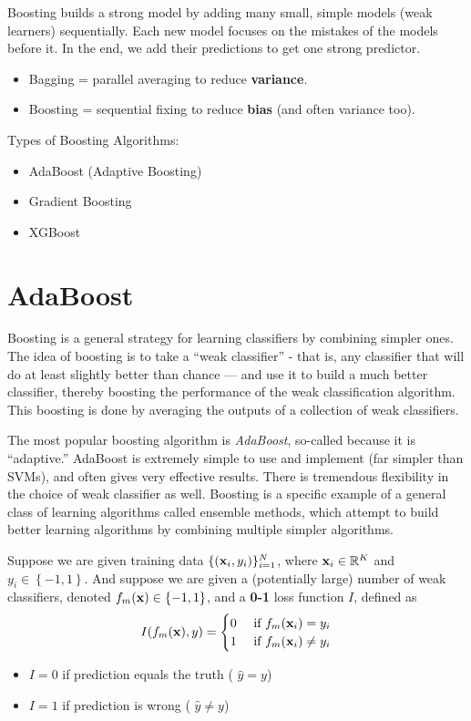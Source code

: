 Boosting builds a strong model by adding many small, simple models (weak learners) sequentially. Each new model focuses on the mistakes of the models before it. In the end, we add their predictions to get one strong predictor.

\begin{itemize}
	\item Bagging = parallel averaging to reduce \textbf{variance}.
	\item Boosting = sequential fixing to reduce \textbf{bias} (and often variance too).
\end{itemize}

Types of Boosting Algorithms:
\begin{itemize}
	\item AdaBoost (Adaptive Boosting)
	\item Gradient Boosting
	\item XGBoost
\end{itemize}

\section{AdaBoost}

Boosting is a general strategy for learning classifiers by combining simpler ones. The idea of boosting is to take a ``weak classifier'' - that is, any classifier that will do at least slightly better than chance — and use it to build a much better classifier, thereby boosting the performance of the weak classification algorithm. This boosting is done by averaging the outputs of a collection of weak classifiers. 

The most popular boosting algorithm is \textit{AdaBoost}, so-called because it is ``adaptive.'' AdaBoost is extremely simple to use and implement (far simpler than SVMs), and often gives very effective results. There is tremendous flexibility in the choice of weak classifier as well. Boosting is a specific example of a general class of learning algorithms called ensemble methods, which attempt to build better learning algorithms by combining multiple simpler algorithms.

Suppose we are given training data $\{({\mathbf{x}}_i, y_i)\}^N_{i=1}$, where ${\mathbf{x}}_i \in \mathbb{R}^K$ and $y_i \in \left\{-1, 1\right\}$. And suppose we are given a (potentially large) number of weak classifiers, denoted $f_m({\mathbf{x}}) \in \left\{-1, 1\right\}$, and a \textbf{0-1} loss function $I$, defined as
\begin{align*}
	I(f_m({\mathbf{x}}), y) = \begin{cases}
		0&\text{ if } f_m({\mathbf{x}}_i)=y_i\\
		1&\text{ if } f_m({\mathbf{x}}_i)\neq y_i
	\end{cases}
\end{align*}
\begin{itemize}
	\item $I=0$ if prediction equals the truth ( $\hat{y}=y$)
	\item $I=1$ if prediction is wrong ( $\hat{y}\neq y$)
\end{itemize}

